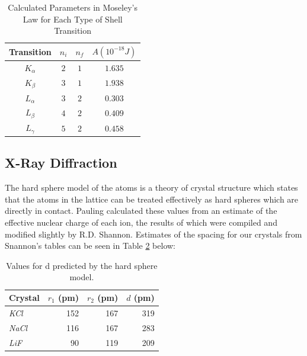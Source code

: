 \documentclass[%
 reprint,
 amsmath,amssymb,
 aps,
 pra,
]{revtex4-1}
\begin{document}
\begin{table}[htbp]
	\begin{center}
		\begin{tabular}{|c|c|c|c|}
			\hline Transition & $n_{i}$  & $n_{f}$ & $A (10^{-18} J)$ \\
			\hline $K_{\alpha}$ & $2$ & $1$ & $1.635$ \\
			\hline $K_{\beta}$ & $3$ & $1$ & $1.938$ \\
			\hline $L_{\alpha}$ & $3$ & $2$ & $0.303$ \\
			\hline $L_{\beta}$ & $4$ & $2$ & $0.409$ \\
			\hline $L_{\gamma}$ & $5$ & $2$ & $0.458$ \\
			\hline
		\end{tabular}
	\end{center}
	\caption{Calculated Parameters in Moseley's Law for Each Type of Shell Transition}
	\label{Tab:RydParam}
\end{table}

\subsection{X-Ray Diffraction}

The hard sphere model of the atoms is a theory of crystal structure which states that the atoms in the lattice can be treated effectively as hard spheres which are directly in contact. Pauling calculated these values from an estimate of the effective nuclear charge of each ion\cite{hard_sphere2}, the results of which were compiled and modified slightly by R.D. Shannon\cite{hard_sphere}. Estimates of the spacing for our crystals from Snannon's tables can be seen in Table \ref{table:hardsphere_d} below:

\begin{table}[htbp]
	\begin{center}
	\begin{tabular}{|l|r|r|r|}
		\hline
		\textbf{Crystal} & \multicolumn{1}{l|}{\textbf{$r_1$ (pm)}} & \multicolumn{1}{l|}{\textbf{$r_2$ (pm)}} & \multicolumn{1}{l|}{\textbf{$d$ (pm)}} \\ \hline
		\textit{KCl } & 152 & 167 & 319 \\ \hline
		\textit{NaCl} & 116 & 167 & 283 \\ \hline
		\textit{LiF} & 90 & 119 & 209 \\ \hline
	\end{tabular}
	\end{center}
	\caption{Values for d predicted by the hard sphere model\cite{hard_sphere}.}
	\label{table:hardsphere_d}
\end{table}
\end{document}
